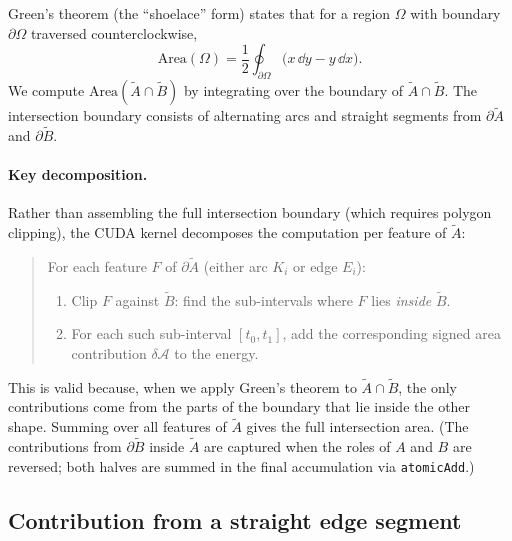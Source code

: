 \documentclass[12pt]{article}
\begin{document}
Green's theorem (the ``shoelace'' form) states that for a region $\Omega$ with
boundary $\partial\Omega$ traversed counterclockwise,
\[
  \mathrm{Area}(\Omega) = \frac{1}{2}\oint_{\partial\Omega}
    \bigl(x\,\dd y - y\,\dd x\bigr).
\]
We compute $\mathrm{Area}(\tilde A \cap \tilde B)$ by integrating over the boundary
of $\tilde A \cap \tilde B$.  The intersection boundary consists of alternating arcs
and straight segments from $\partial\tilde A$ and $\partial\tilde B$.

\paragraph{Key decomposition.}
Rather than assembling the full intersection boundary (which requires polygon clipping),
the CUDA kernel decomposes the computation per feature of $\tilde A$:

\begin{quote}
For each feature $F$ of $\partial\tilde A$ (either arc $K_i$ or edge $E_i$):
\begin{enumerate}
  \item Clip $F$ against $\tilde B$: find the sub-intervals where $F$ lies \emph{inside}
        $\tilde B$.
  \item For each such sub-interval $[t_0, t_1]$, add the corresponding signed area
        contribution $\delta\!\mathcal{A}$ to the energy.
\end{enumerate}
\end{quote}

This is valid because, when we apply Green's theorem to $\tilde A \cap \tilde B$,
the only contributions come from the parts of the boundary that lie inside the other
shape.  Summing over all features of $\tilde A$ gives the full intersection area.
(The contributions from $\partial\tilde B$ inside $\tilde A$ are captured when the
roles of $A$ and $B$ are reversed; both halves are summed in the final accumulation
via \texttt{atomicAdd}.)

\subsection{Contribution from a straight edge segment}
\label{sec:edge_contrib}
\end{document}
